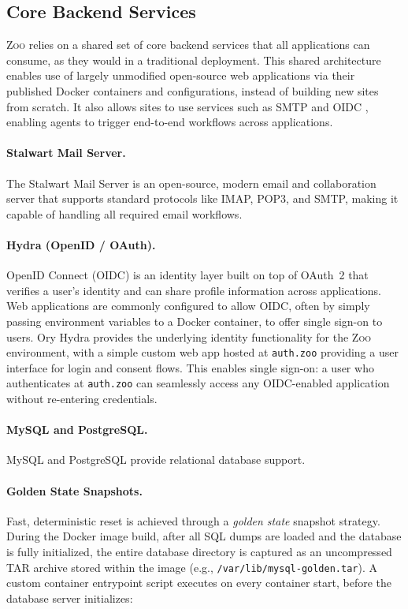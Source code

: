 \documentclass{article} %
\newcommand{\zoo}{\textsc{Zoo}}
\begin{document}
\subsection{Core Backend Services}
\label{sec:core_backend_services}

\zoo{} relies on a shared set of core backend services that all applications can consume, as they would in a traditional deployment.
This shared architecture enables use of largely unmodified open-source web applications via their published Docker containers and configurations, instead of building new sites from scratch.
It also allows sites to use services such as SMTP \citep{smtp} and OIDC \citep{openidconnect}, enabling agents to trigger end-to-end workflows across applications.

\paragraph{Stalwart Mail Server.}
The Stalwart Mail Server \citep{stalwart} is an open-source, modern email and collaboration server that supports standard protocols like IMAP, POP3, and SMTP, making it capable of handling all required email workflows.

\paragraph{Hydra (OpenID / OAuth).}
OpenID Connect (OIDC) \citep{openidconnect} is an identity layer built on top of OAuth~2 \citep{oauth2,oauth2bearertoken} that verifies a user's identity and can share profile information across applications.
Web applications are commonly configured to allow OIDC, often by simply passing environment variables to a Docker container, to offer single sign-on to users.
Ory Hydra \citep{oryhydra} provides the underlying identity functionality for the \zoo{} environment, with a simple custom web app hosted at \texttt{auth.zoo} providing a user interface for login and consent flows.
This enables single sign-on: a user who authenticates at \texttt{auth.zoo} can seamlessly access any OIDC-enabled application without re-entering credentials.

\paragraph{MySQL and PostgreSQL.}
MySQL \citep{mysql} and PostgreSQL \citep{postgresql} provide relational database support.

\paragraph{Golden State Snapshots.}
Fast, deterministic reset is achieved through a \textit{golden state} snapshot strategy.
During the Docker image build, after all SQL dumps are loaded and the database is fully initialized, the entire database directory is captured as an uncompressed TAR archive stored within the image (e.g., \texttt{/var/lib/mysql-golden.tar}).
A custom container entrypoint script executes on every container start, before the database server initializes:
\end{document}
